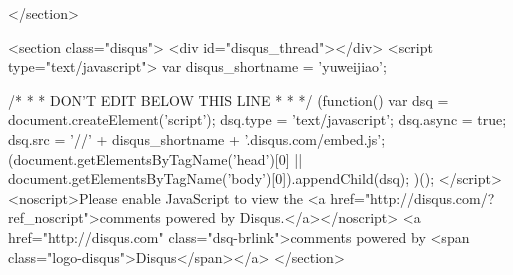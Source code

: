     
    
    
  
    
    
    
    
    
    
    
  
    
    
    
    
    
    
    
  
    
    
    
    
    
    
    
  
    
    
    
    
    
    
    
  
    
    
    
    
    
    
    
  
    
    
    
    
    
    
    
  
    
    
    
    
    
    
    
  
    
    
    
    
    
    
    
  
    
    
    
    
    
    
    
  
</section>




<section class="disqus">
  <div id="disqus_thread"></div>
  <script type="text/javascript">
    var disqus_shortname = 'yuweijiao';

    /* * * DON'T EDIT BELOW THIS LINE * * */
    (function() {
        var dsq = document.createElement('script'); dsq.type = 'text/javascript'; dsq.async = true;
        dsq.src = '//' + disqus_shortname + '.disqus.com/embed.js';
        (document.getElementsByTagName('head')[0] || document.getElementsByTagName('body')[0]).appendChild(dsq);
    })();
  </script>
  <noscript>Please enable JavaScript to view the <a href="http://disqus.com/?ref_noscript">comments powered by Disqus.</a></noscript>
  <a href="http://disqus.com" class="dsq-brlink">comments powered by <span class="logo-disqus">Disqus</span></a>
</section>



